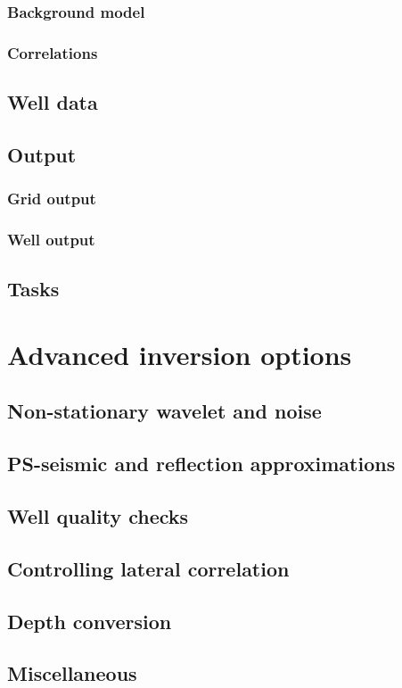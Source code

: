 \subsubsection{Background model}
\subsubsection{Correlations}
\subsection{Well data}
\subsection{Output}
\subsubsection{Grid output}
\subsubsection{Well output}
\subsection{Tasks}
\section{Advanced inversion options}
\subsection{Non-stationary wavelet and noise}
\subsection{PS-seismic and reflection approximations}
\subsection{Well quality checks}
\subsection{Controlling lateral correlation}
\subsection{Depth conversion}
\subsection{Miscellaneous}
